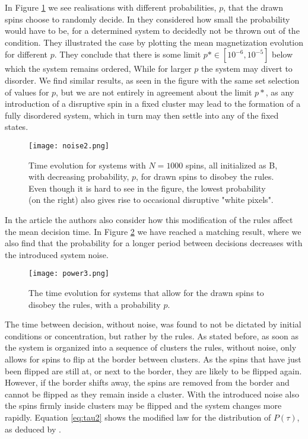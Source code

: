 \documentclass[a4paper]{article}
\begin{document}
In Figure \ref{fig:noise1} we see realisations with different probabilities, $p$, that the drawn spins choose to randomly decide. In \cite{opinion} they considered how small the probability would have to be, for a determined system to decidedly not be thrown out of the condition. They illustrated the case by plotting the mean magnetization evolution for different $p$. They conclude that there is some limit $p*\in [10^{-6},10^{-5}]$ below which the system remains ordered, While for larger $p$ the system may divert to disorder. We find similar results, as seen in the figure with the same set selection of values for $p$, but we are not entirely in agreement about the limit $p*$, as any introduction of a disruptive spin in a fixed cluster may lead to the formation of a fully disordered system, which in turn may then settle into any of the fixed states. 

\begin{figure}[H]
 \centerline{\texttt{[image: noise2.png]}}
 \caption{Time evolution for systems with $N=1000$ spins, all initialized as B, with decreasing probability, $p$, for drawn spins to disobey the rules. Even though it is hard to see in the figure, the lowest probability (on the right) also gives rise to occasional disruptive "white pixels".}
 \label{fig:noise1}
\end{figure}



In the article \cite{opinion} the authors also consider how this modification of the rules affect the mean decision time. In Figure \ref{fig:noise2} we have reached a matching result, where we also find that the probability for a longer period between decisions decreases with the introduced system noise.


\begin{figure}[H]
 \centerline{\texttt{[image: power3.png]}}
 \caption{The time evolution for systems that allow for the drawn spins to disobey the rules, with a probability $p$.}
 \label{fig:noise2}
\end{figure}

The time between decision, without noise, was found to not be dictated by initial conditions or concentration, but rather by the rules. As stated before, as soon as the system is organized into a sequence of clusters the rules, without noise, only allows for spins to flip at the border between clusters. As the spins that have just been flipped are still at, or next to the border, they are likely to be flipped again. However, if the border shifts away, the spins are removed from the border and cannot be flipped as they remain inside a cluster. With the introduced noise also the spins firmly inside clusters may be flipped and the system changes more rapidly. Equation \ref{eq:tau2} shows the modified law for the distribution of $P(\tau)$, as deduced by \cite{opinion}. 
\end{document}
